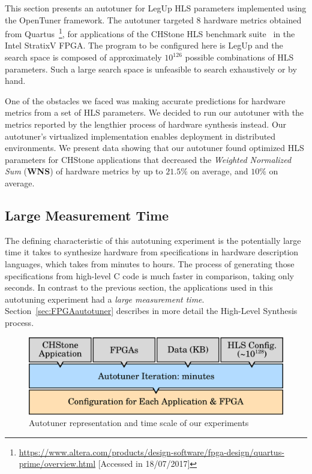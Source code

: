 This section presents an autotuner for LegUp HLS parameters implemented using
the OpenTuner framework.  The autotuner targeted 8 hardware metrics obtained
from
Quartus~\footnote{\url{https://www.altera.com/products/design-software/fpga-design/quartus-prime/overview.html}
[Accessed in 18/07/2017]}, for applications of the CHStone HLS benchmark
suite~\cite{hara2008chstone} in the Intel StratixV FPGA.  The program to be
configured here is LegUp and the search space is composed of approximately
$10^{126}$ possible combinations of HLS parameters.  Such a large search space
is unfeasible to search exhaustively or by hand.

One of the obstacles we faced was making accurate predictions for hardware
metrics from a set of HLS parameters. We decided to run our autotuner with the
metrics reported by the lengthier process of hardware synthesis instead.  Our
autotuner's virtualized implementation enables deployment in distributed
environments.  We present data showing that our autotuner found optimized HLS
parameters for CHStone applications that decreased the \textit{Weighted
Normalized Sum} (\textbf{WNS}) of hardware metrics by up to $21.5\%$ on
average, and $10\%$ on average.

\subsection{Large Measurement Time}
\label{sec:bigtime}

The defining characteristic of this autotuning experiment is the potentially
large time it takes to synthesize hardware from specifications in hardware
description languages, which takes from minutes to hours. The process of
generating those specifications from high-level C code is much faster in
comparison, taking only seconds. In contrast to the previous section, the
applications used in this autotuning experiment had a \textit{large measurement
time}. Section~\ref{sec:FPGAautotuner} describes in more detail the High-Level
Synthesis process.

\begin{figure}[htpb]
    \centering
    \includegraphics[width=.65\textwidth]{./images/overview_fpgas_small}
    \caption{Autotuner representation and time scale of our experiments}
    \label{fig:overview-fpgas-small}
\end{figure}

